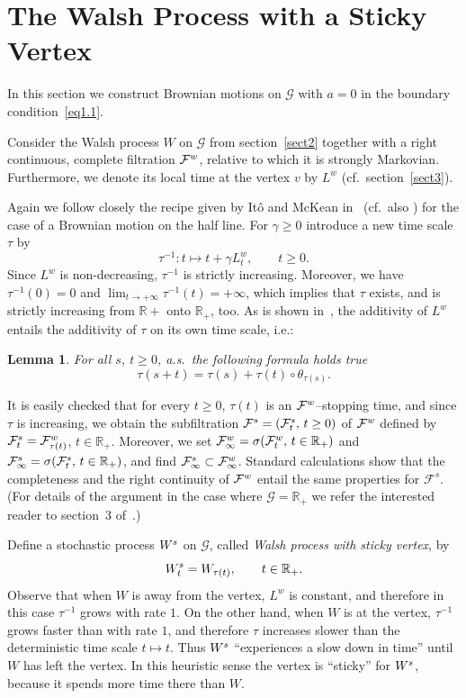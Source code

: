 \documentclass[11pt,a4paper]{amsart}
\renewcommand{\gg}{\gamma}
\newcommand{\gs}{\sigma}
\newcommand{\cF}{\mathcal{F}}
\newcommand{\cG}{\mathcal{G}}
\newcommand{\1}{1}
\newcommand{\R}{\mathbb{R}}
\newtheorem{lemma}[theorem]{Lemma}
\theoremstyle{remark}
\let\comp\circ
\newcommand{\cFW}{\ensuremath \cF^w}
\newcommand{\Ws}{\ensuremath W^s}
\newcommand{\cFsW}{\ensuremath \cF^s}
\numberwithin{equation}{section}
\begin{document}
\section{The Walsh Process with a Sticky Vertex}  \label{sect4}
In this section  we construct Brownian motions on $\cG$ with $a=0$ in the boundary
condition~\eqref{eq1.1}.

Consider the Walsh process $W$ on $\cG$ from section~\ref{sect2} together with
a right continuous, complete filtration $\cFW$, relative to which it is strongly
Markovian. Furthermore, we denote its local time at the vertex $v$ by $L^w$ (cf.\
section~\ref{sect3}).

Again we follow closely the recipe given by It\^o and McKean in~\cite{ItMc63} (cf.\
also \cite[Section~6.2]{Kn81}) for the case of a Brownian motion on the half line.
For $\gg\ge 0$ introduce a new time scale $\tau$ by
\begin{equation}    \label{eq4.1}
    \tau^{-1}: t\mapsto t + \gg L^w_t,    \qquad t\ge 0.
\end{equation}
Since $L^w$ is non-decreasing, $\tau^{-1}$ is strictly increasing. Moreover, we have
$\tau^{-1}(0)=0$ and $\lim_{t\to+\infty}\tau^{-1}(t) = +\infty$, which implies that
$\tau$ exists, and is strictly increasing from $\R+$ onto $\R_+$, too. As is shown
in~\cite[p.~160]{Kn81}, the additivity of $L^w$ entails the additivity of $\tau$ on
its own time scale, i.e.:

\begin{lemma}   \label{lem4.1}
For all $s$, $t\ge 0$, a.s.\ the following formula holds true
\begin{equation}    \label{eq4.2}
    \tau(s+t) = \tau(s) + \tau(t)\comp \theta_{\tau(s)}.
\end{equation}
\end{lemma}

It is easily checked that for every $t\ge 0$, $\tau(t)$ is an $\cFW$--stopping time,
and since $\tau$ is increasing, we obtain the subfiltration $\cFsW = (\cFsW_t,\,t\ge
0)$ of $\cFW$ defined by $\cFsW_t = \cFW_{\tau(t)}$, $t\in\R_+$. Moreover, we set
$\cFW_\infty = \gs(\cFW_t,\,t\in\R_+)$ and $\cFsW_\infty = \gs(\cFsW_t,\,t\in\R_+)$,
and find $\cFsW_\infty\subset \cFW_\infty$. Standard calculations show that the
completeness and the right continuity of $\cFW$ entail the same properties for
$\cF^s$. (For details of the argument in the case where $\cG=\R_+$ we refer the
interested reader to section~3 of~\cite{BMMG0}.)

Define a stochastic process $\Ws$ on $\cG$, called \emph{Walsh process with sticky
vertex}, by
\begin{equation}    \label{eq4.3}
    \Ws_t = W_{\tau(t)},\qquad t\in\R_+.
\end{equation}
Observe that when $W$ is away from the vertex, $L^w$ is constant, and therefore in
this case $\tau^{-1}$ grows with rate $1$. On the other hand, when $W$ is at the
vertex, $\tau^{-1}$ grows faster than with rate $1$, and therefore $\tau$ increases
slower than the deterministic time scale $t\mapsto t$. Thus $\Ws$ ``experiences a
slow down in time'' until $W$ has left the vertex. In this heuristic sense the
vertex is ``sticky'' for $\Ws$, because it spends more time there than $W$.
\end{document}
